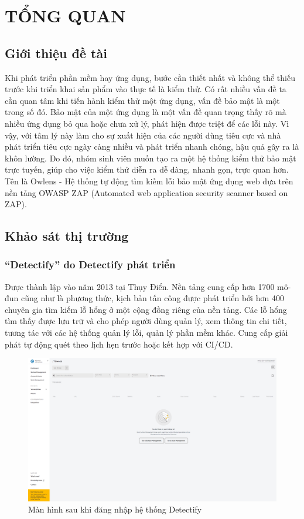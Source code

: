 \chapter{TỔNG QUAN}

\section{Giới thiệu đề tài}

\tab Khi phát triển phần mềm hay ứng dụng, bước cần thiết nhất và không thể thiếu trước khi triển khai sản phẩm vào thực tế là kiểm thử.
Có rất nhiều vấn đề ta cần quan tâm khi tiến hành kiểm thử một ứng dụng, vấn đề bảo mật là một trong số đó.
Bảo mật của một ứng dụng là một vấn đề quan trọng thấy rõ mà nhiều ứng dụng bỏ qua hoặc chưa xử lý, phát hiện được triệt để các lỗi này.
Vì vậy, với tâm lý này làm cho sự xuất hiện của các người dùng tiêu cực và nhà phát triển tiêu cực ngày càng nhiều và phát triển nhanh chóng, hậu quả gây ra là khôn lường.
Do đó, nhóm sinh viên muốn tạo ra một hệ thống kiểm thử bảo mật trực tuyến, giúp cho việc kiểm thử diễn ra dễ dàng, nhanh gọn, trực quan hơn.
Tên là Owlens - Hệ thống tự động tìm kiếm lỗi bảo mật ứng dụng web dựa trên nền tảng OWASP ZAP (Automated web application security scanner based on ZAP).

\newpage
\section{Khảo sát thị trường}
\subsection{“Detectify” do Detectify phát triển}

\tab Được thành lập vào năm 2013 tại Thụy Điển.
Nền tảng cung cấp hơn 1700 mô-đun cũng như là phương thức, kịch bản tấn công được phát triển bởi hơn 400 chuyên gia tìm kiếm lỗ hổng ở một cộng đồng riêng của nền tảng.
Các lỗ hổng tìm thấy được lưu trữ và cho phép người dùng quản lý, xem thông tin chi tiết, tương tác với các hệ thống quản lý lỗi, quản lý phần mềm khác.
Cung cấp giải phát tự động quét theo lịch hẹn trước hoặc kết hợp với CI/CD.

\begin{figure}[H]
    \centering
    \includegraphics[width=\textwidth]{applied-thesis-chapters/chapter-1/detectify.com_app_vulnerabilities.png}
    \caption{Màn hình sau khi đăng nhập hệ thống Detectify}
\end{figure}


